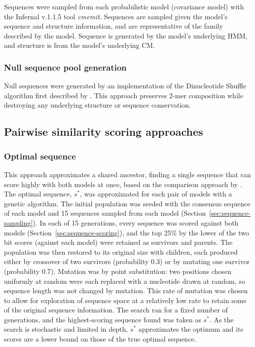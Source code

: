 Sequences were sampled from each probabilistic model (covariance model) with the Infernal v.1.1.5 tool \emph{cmemit}.
Sequences are sampled given the model's sequence and structure information, and are representative of the family described by the model.
Sequence is generated by the model's underlying \ac{HMM}, and structure is from the model's underlying \ac{CM}.

\subsubsection{Null sequence pool generation}
\label{sec:dinuc-shuffle}

Null sequences were generated by an implementation of the Dinucleotide Shuffle algorithm first described by \citet{Altschul1985}.
This approach preserves 2-mer composition while destroying any underlying structure or sequence conservation.

\subsection{Pairwise similarity scoring approaches}

\subsubsection{Optimal sequence}
\label{subsubsec:optimal-sequence}

This approach approximates a shared ancestor, finding a single sequence that can score highly with both models at once, based on the comparison approach by \citet{Eggenhofer2013}.
The optimal sequence, $s^{*}$, was approximated for each pair of models with a genetic algorithm.
The initial population was seeded with the consensus sequence of each model and 15 sequences sampled from each model (Section~\ref{sec:sequence-sampling}).
In each of 15 generations, every sequence was scored against both models (Section~\ref{sec:sequence-scoring}), and the top 25\% by the lower of the two bit scores (against each model) were retained as survivors and parents.
The population was then restored to its original size with children, each produced either by crossover of two survivors (probability 0.3) or by mutating one survivor (probability 0.7).
Mutation was by point substitution: two positions chosen uniformly at random were each replaced with a nucleotide drawn at random, so sequence length was not changed by mutation.
This rate of mutation was chosen to allow for exploration of sequence space at a relatively low rate to retain some of the original sequence information.
The search ran for a fixed number of generations, and the highest-scoring sequence found was taken as $s^{*}$.
As the search is stochastic and limited in depth, $s^{*}$ approximates the optimum and its scores are a lower bound on those of the true optimal sequence.

